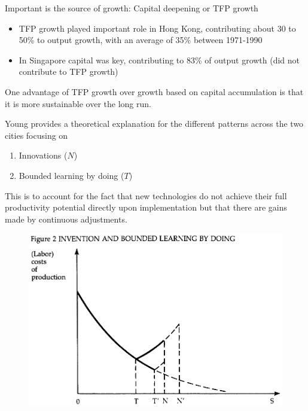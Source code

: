 \documentclass{beamer}
\begin{document}
\begin{frame}
Important is the source of growth: Capital deepening or TFP growth
  \begin{itemize}
    \item TFP growth played important role in Hong Kong, contributing about 30 to 50\% to output growth, with an average of 35\% between 1971-1990
    \item In Singapore capital was key, contributing to 83\% of output growth (did not contribute to TFP growth)
  \end{itemize}
  \medskip
  One advantage of TFP growth over growth based on capital accumulation is that it is more sustainable over the long run.   
\end{frame}


\begin{frame}
Young provides a theoretical explanation for the different patterns across the two cities focusing on
\begin{enumerate}
  \item Innovations ($N$)
  \item Bounded learning by doing ($T$)
\end{enumerate}
This is to account for the fact that new technologies do not achieve their full productivity potential directly upon implementation but that there are gains made by continuous adjustments.
\end{frame}

\begin{frame}
  \begin{figure}
    \includegraphics[scale=.8]{young3.eps}
  \end{figure}
\end{frame}
\end{document}
